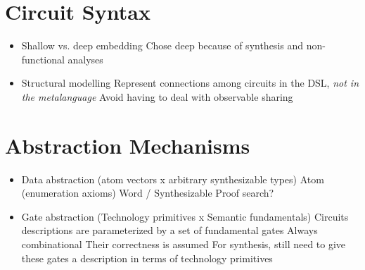 \documentclass[a4paper,draft]{report}
\begin{document}
        \section{Circuit Syntax}
        \label{sec:circuit-types}
            \begin{itemize}
                \item Shallow vs. deep embedding
                    \subitem Chose deep because of synthesis and non-functional analyses
                \item Structural modelling
                    \subitem Represent connections among circuits in the DSL, \emph{not in the metalanguage}
                    \subitem Avoid having to deal with observable sharing
            \end{itemize}

        \section{Abstraction Mechanisms}
        \label{sec:abstraction}
            \begin{itemize}
                \item Data abstraction (atom vectors x arbitrary synthesizable types)
                    \subitem Atom (enumeration axioms)
                    \subitem Word / Synthesizable
                        \subsubitem Proof search?
                \item Gate abstraction (Technology primitives x Semantic fundamentals)
                    \subitem Circuits descriptions are parameterized by a set of fundamental gates
                        \subsubitem Always combinational
                        \subsubitem Their correctness is assumed
                    \subitem For synthesis, still need to give these gates a description in terms of technology primitives
            \end{itemize}
\end{document}
